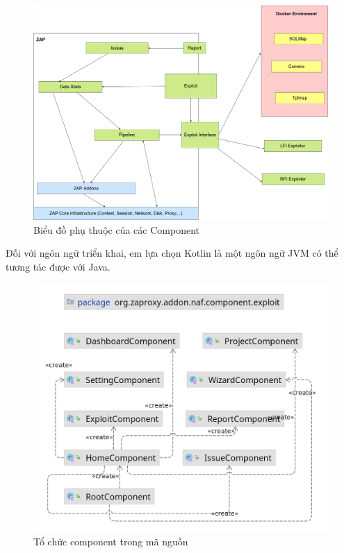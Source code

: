 \documentclass[./../main.tex]{subfiles}
\begin{document}
\begin{figure}[h!]
	\includegraphics[width=\linewidth]{./images/component.png}
	\caption{Biểu đồ phụ thuộc của các Component}
	\label{fig:component}
\end{figure}

Đối với ngôn ngữ triển khai, em lựa chọn Kotlin là một ngôn ngữ JVM
có thể tương tác được với Java.

\begin{figure}[h!]
	\includegraphics[width=\linewidth]{./images/package.png}
	\caption{Tổ chức component trong mã nguồn}
	\label{fig:package}
\end{figure}
\end{document}
